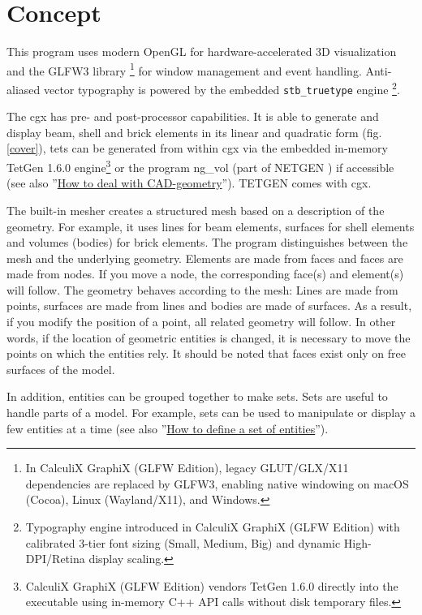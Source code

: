 \documentclass{article}
\providecommand{\htmlref}[2]{\hyperref[#2]{#1}}
\begin{document}
\section{Concept}
This program uses modern OpenGL for hardware-accelerated 3D visualization and the GLFW3 library \cite{glfw}\footnote{In CalculiX GraphiX (GLFW Edition), legacy GLUT/GLX/X11 dependencies are replaced by GLFW3, enabling native windowing on macOS (Cocoa), Linux (Wayland/X11), and Windows.} for window management and event handling. Anti-aliased vector typography is powered by the embedded \texttt{stb\_truetype} engine \cite{stb}\footnote{Typography engine introduced in CalculiX GraphiX (GLFW Edition) with calibrated 3-tier font sizing (Small, Medium, Big) and dynamic High-DPI/Retina display scaling.}.

The cgx has pre- and post-processor capabilities. It is able to generate and display beam, shell and brick elements in its linear and quadratic form (fig. \ref{cover}), tets can be generated from within cgx via the embedded in-memory TetGen 1.6.0 engine\footnote{CalculiX GraphiX (GLFW Edition) vendors TetGen 1.6.0 directly into the executable using in-memory C++ API calls without disk temporary files.} \cite{TETGEN} or the program ng\_vol (part of NETGEN \cite{NETGEN}) if accessible (see also ''\htmlref{How to deal with CAD-geometry}{How to deal with CAD-geometry}''). TETGEN comes with cgx.

The built-in mesher creates a structured mesh based on a description of the geometry. For example, it uses lines for beam elements, surfaces for shell elements and volumes (bodies) for brick elements. The program distinguishes between the mesh and the underlying geometry. Elements are made from faces and faces are made from nodes. If you move a node, the corresponding face(s) and element(s) will follow. The geometry behaves according to the mesh:
Lines are made from points, surfaces are made from lines and bodies are made of surfaces. As a result, if you modify the position of a point, all related geometry will follow. In other words, if the location of geometric entities is changed, it is necessary to move the points on which the entities rely.  It should be noted that faces exist only on free surfaces of the model.

In addition, entities can be grouped together to make sets. Sets are useful to handle parts of a model. For example, sets can be used to manipulate or display a few entities at a time (see also ''\htmlref{How to define a set of entities}{How to define a set of entities}''). 
\end{document}
